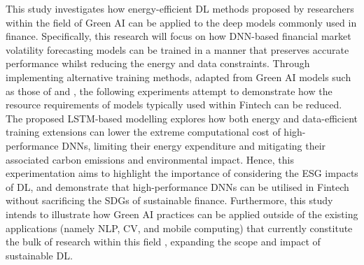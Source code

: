\documentclass[a4paper, 11pt]{report}
\begin{document}
    This study investigates how energy-efficient DL methods proposed by researchers within the field of Green AI can be applied to the deep models commonly used in finance. Specifically, this research will focus on how DNN-based financial market volatility forecasting models can be trained in a manner that preserves accurate performance whilst reducing the energy and data constraints. Through implementing alternative training methods, adapted from Green AI models such as those of \citet{ott-2017} and \citet{xu-2018}, the following experiments attempt to demonstrate how the resource requirements of models typically used within Fintech can be reduced. The proposed LSTM-based modelling explores how both energy and data-efficient training extensions can lower the extreme computational cost of high-performance DNNs, limiting their energy expenditure and mitigating their associated carbon emissions and environmental impact. Hence, this experimentation aims to highlight the importance of considering the ESG impacts of DL, and demonstrate that high-performance DNNs can be utilised in Fintech without sacrificing the SDGs of sustainable finance. Furthermore, this study intends to illustrate how Green AI practices can be applied outside of the existing applications (namely NLP, CV, and mobile computing) that currently constitute the bulk of research within this field \citep{xu-2021}, expanding the scope and impact of sustainable DL.
\end{document}
